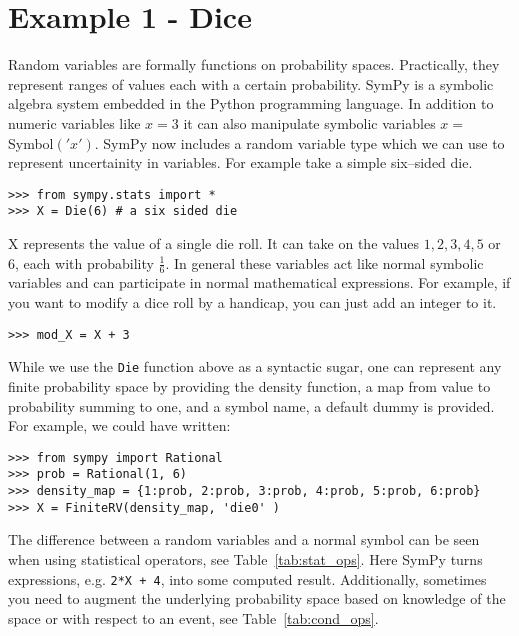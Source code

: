 \section{Example 1 - Dice}

Random variables are formally functions on probability spaces.  Practically, they
represent ranges of values each with a certain probability.  SymPy is a
symbolic algebra system embedded in the Python programming language. In
addition to numeric variables like $x = 3$ it can also manipulate symbolic
variables $ x = $Symbol$('x')$. SymPy now includes a random variable type which
we can use to represent uncertainity in variables.  For example take a simple
six--sided die.

\begin{lstlisting}
>>> from sympy.stats import *
>>> X = Die(6) # a six sided die
\end{lstlisting}

X represents the value of a single die roll. It can take on the values
$1,2,3,4,5$ or $6$, each with probability $\frac{1}{6}$. In general these
variables act like normal symbolic variables and can participate in normal
mathematical expressions. For example, if you want to modify a dice roll by a
handicap, you can just add an integer to it.

\begin{lstlisting}
>>> mod_X = X + 3
\end{lstlisting}

While we use the {\tt Die} function above as a syntactic sugar, one can
represent any finite probability space by providing the density function, a map
from value to probability summing to one, and a symbol name, a default dummy is
provided.  For example, we could have written:
\begin{lstlisting}
>>> from sympy import Rational
>>> prob = Rational(1, 6)
>>> density_map = {1:prob, 2:prob, 3:prob, 4:prob, 5:prob, 6:prob}
>>> X = FiniteRV(density_map, 'die0' )
\end{lstlisting}

The difference between a random variables and a normal symbol can be seen when
using statistical operators, see Table~\ref{tab:stat_ops}. Here SymPy turns
expressions, e.g. {\tt 2*X + 4}, into some computed result. Additionally,
sometimes you need to augment the underlying probability space based on
knowledge of the space or with respect to an event, see Table~\ref{tab:cond_ops}.

